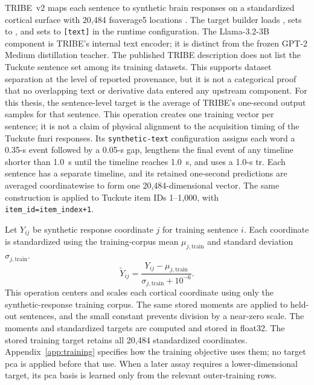 TRIBE~v2 maps each sentence to synthetic brain responses on a standardized cortical surface with 20,484 fsaverage5 locations \autocite{dascoli2026}.
The target builder loads , sets  to , and sets  to \texttt{[text]} in the runtime configuration. 
The Llama-3.2-3B component is TRIBE's internal text encoder; it is distinct from the frozen GPT-2 Medium distillation teacher. 
The published TRIBE description does not list the Tuckute sentence set among its training datasets.
This supports dataset separation at the level of reported provenance, but it is not a categorical proof that no overlapping text or derivative data entered any upstream component.\autocite{dascoli2026}
For this thesis, the sentence-level target is the average of TRIBE's one-second output samples for that sentence.
This operation creates one training vector per sentence; it is not a claim of physical alignment to the acquisition timing of the Tuckute \ac{fmri} responses.
Its \texttt{synthetic-text} configuration assigns each word a 0.35-s event followed by a 0.05-s gap, lengthens the final event of any timeline shorter than 1.0~s until the timeline reaches 1.0~s, and uses a 1.0-s \ac{tr}. 
Each sentence has a separate timeline, and its retained one-second predictions are averaged coordinatewise to form one 20,484-dimensional vector.
The same construction is applied to Tuckute item IDs 1--1,000, with \texttt{item\_id=item\_index+1}. 

Let $Y_{ij}$ be synthetic response coordinate $j$ for training sentence $i$.
Each coordinate is standardized using the training-corpus mean $\mu_{j,\mathrm{train}}$ and standard deviation $\sigma_{j,\mathrm{train}}$.
\[
  \widetilde{Y}_{ij}
  =
  \frac{Y_{ij}-\mu_{j,\mathrm{train}}}
       {\sigma_{j,\mathrm{train}}+10^{-6}}.
\]
This operation centers and scales each cortical coordinate using only the synthetic-response training corpus.
The same stored moments are applied to held-out sentences, and the small constant prevents division by a near-zero scale.
The moments and standardized targets are computed and stored in float32.
The stored training target retains all 20,484 standardized coordinates.
Appendix~\ref{app:training} specifies how the training objective uses them; no target \ac{pca} is applied before that use.
When a later assay requires a lower-dimensional target, its \ac{pca} basis is learned only from the relevant outer-training rows. 

